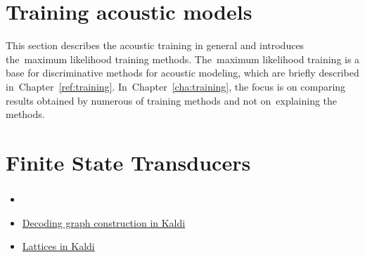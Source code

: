 


\section{Training acoustic models} 
\label{sec:training_acoustic_models}

This section describes the acoustic training in general and introduces the~maximum likelihood training methods.
The~maximum likelihood training is a base for discriminative methods for acoustic modeling, which are briefly
described in~Chapter~\ref{ref:training}.
In~Chapter~\ref{cha:training}, the focus is on comparing results obtained by numerous of training methods
and not on~explaining the methods.









\section{Finite State Transducers} 
\label{sec:fst}



\subsubsection*{} %

\begin{itemize}
    \item {}
    \item \href{http://kaldi.sourceforge.net/graph.html} {Decoding graph construction in Kaldi}
    \item \href{http://kaldi.sourceforge.net/lattices.html} {Lattices in Kaldi}
\end{itemize}

